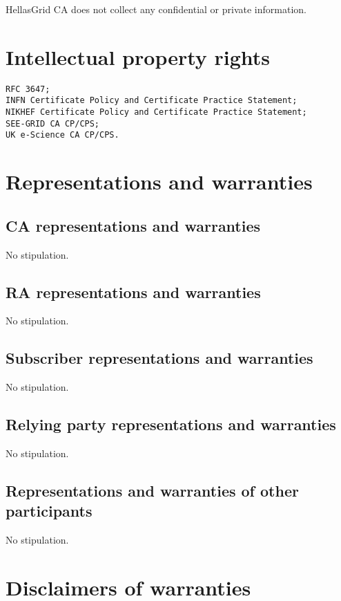 HellasGrid CA does not collect any confidential or private information.

\section{Intellectual property rights}

\begin{verbatim}
RFC 3647;
INFN Certificate Policy and Certificate Practice Statement;
NIKHEF Certificate Policy and Certificate Practice Statement;
SEE-GRID CA CP/CPS;
UK e-Science CA CP/CPS.
\end{verbatim}

\section{Representations and warranties}
\subsection{CA representations and warranties}

No stipulation.

\subsection{RA representations and warranties}

No stipulation.

\subsection{Subscriber representations and warranties}

No stipulation.

\subsection{Relying party representations and warranties}

No stipulation.

\subsection{Representations and warranties of other participants}


No stipulation.

\section{Disclaimers of warranties}

